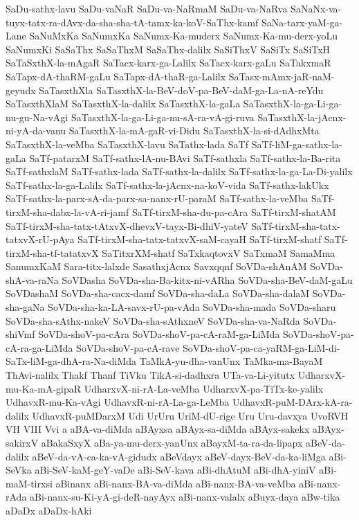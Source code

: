 {SaDu-sathx-lavu
SaDu-vaNaR
SaDu-va-NaRmaM
SaDu-va-NaRva
SaNaNx-va-tuyx-tatx-ra-dAvx-da-sha-sha-tA-tamx-ka-koV-SaThx-kamf
SaNa-tarx-yaM-ga-Lane
SaNuMxKa
SaNumxKa
SaNumx-Ka-muderx
SaNumx-Ka-mu-derx-yoLu
SaNumxKi
SaSaThx
SaSaThxM
SaSaThx-dalilx
SaSiThxV
SaSiTx
SaSiTxH
SaTaSxthX-la-mAgaR
SaTacx-karx-ga-Lalilx
SaTacx-karx-gaLu
SaTakxmaR
SaTapx-dA-thaRM-gaLu
SaTapx-dA-thaR-ga-Lalilx
SaTasx-mAmx-jaR-naM-geyudx
SaTasxthXla
SaTasxthX-la-BeV-doV-pa-BeV-daM-ga-La-nA-reYdu
SaTasxthXlaM
SaTasxthX-la-dalilx
SaTasxthX-la-gaLa
SaTasxthX-la-ga-Li-ga-nu-gu-Na-vAgi
SaTasxthX-la-ga-Li-ga-nu-sA-ra-vA-gi-ruva
SaTasxthX-la-jAcnx-ni-yA-da-vanu
SaTasxthX-la-mA-gaR-vi-Didu
SaTasxthX-la-si-dAdhxMta
SaTasxthX-la-veMba
SaTasxthX-lavu
SaTathx-lada
SaTf
SaTf-liM-ga-sathx-la-gaLa
SaTf-patarxM
SaTf-sathx-lA-nu-BAvi
SaTf-sathxla
SaTf-sathx-la-Ba-rita
SaTf-sathxlaM
SaTf-sathx-lada
SaTf-sathx-la-dalilx
SaTf-sathx-la-ga-La-Di-yalilx
SaTf-sathx-la-ga-Lalilx
SaTf-sathx-la-jAcnx-na-koV-vida
SaTf-sathx-lakUkx
SaTf-sathx-la-parx-sA-da-parx-sa-nanx-rU-paraM
SaTf-sathx-la-veMba
SaTf-tirxM-sha-dabx-la-vA-ri-jamf
SaTf-tirxM-sha-du-pa-cAra
SaTf-tirxM-shatAM
SaTf-tirxM-sha-tatx-tAtxvX-dhevxV-tayx-Bi-dhiV-yateV
SaTf-tirxM-sha-tatx-tatxvX-rU-pAya
SaTf-tirxM-sha-tatx-tatxvX-saM-cayaH
SaTf-tirxM-shatf
SaTf-tirxM-sha-tf-tatatxvX
SaTitxrXM-shatf
SaTxkaqtovxV
SaTxmaM
SamaMma
SanumxKaM
Sara-titx-lalxde
SasathxjAcnx
Savxqqnf
SoVDa-shAnAM
SoVDa-shA-va-raNa
SoVDasha
SoVDa-sha-Ba-kitx-ni-vARha
SoVDa-sha-BeV-daM-gaLu
SoVDashaM
SoVDa-sha-cacx-damf
SoVDa-sha-daLa
SoVDa-sha-dalaM
SoVDa-sha-gaNa
SoVDa-sha-ka-LA-savx-rU-pa-vAda
SoVDa-sha-mada
SoVDa-sharu
SoVDa-sha-sAthx-nakeV
SoVDa-sha-sAthxneV
SoVDa-sha-va-NaRda
SoVDa-shiVmf
SoVDa-shoV-pa-cAra
SoVDa-shoV-pa-cA-raM-ga-LiMda
SoVDa-shoV-pa-cA-ra-ga-LiMda
SoVDa-shoV-pa-cA-rave
SoVDa-shoV-pa-ca-yaRM-ga-LiM-di-SaTx-liM-ga-dhA-ra-Na-diMda
TaMkA-yu-dha-vanUnx
TaMka-ma-BayaM
ThAvi-nalilx
Thakf
Thanf
TiVku
TikA-si-dadhxra
UTa-va-Li-yitutx
UdharxvX-mu-Ka-mA-gipaR
UdharxvX-ni-rA-La-veMba
UdharxvX-pa-TiTx-ke-yalilx
UdhavxR-mu-Ka-vAgi
UdhavxR-ni-rA-La-ga-LeMba
UdhavxR-puM-DArx-kA-ra-dalilx
UdhavxR-puMDarxM
Udi
UrUru
UriM-dU-rige
Uru
Uru-davxya
UvoRVH
VH
VIII
Vvi
a
aBA-va-diMda
aBAyxsa
aBAyx-sa-diMda
aBAyx-sakekx
aBAyx-sakirxV
aBakaSxyX
aBa-ya-mu-derx-yanUnx
aBayxM-ta-ra-da-lipapx
aBeV-da-dalilx
aBeV-da-vA-ca-ka-vA-gidudx
aBeVdayx
aBeV-dayx-BeV-da-ka-liMga
aBi-SeVka
aBi-SeV-kaM-geY-vaDe
aBi-SeV-kava
aBi-dhAtuM
aBi-dhA-yiniV
aBi-maM-tirxsi
aBinanx
aBi-nanx-BA-va-diMda
aBi-nanx-BA-va-veMba
aBi-nanx-rAda
aBi-nanx-su-Ki-yA-gi-deR-nayAyx
aBi-nanx-valalx
aBuyx-daya
aBw-tika
aDaDx
aDaDx-hAki
}
